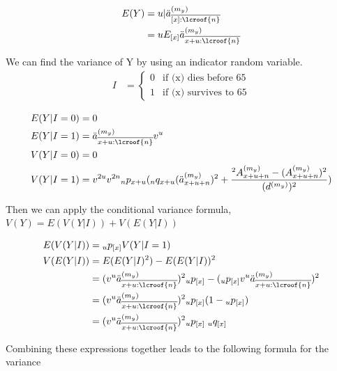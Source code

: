 \documentclass[12pt]{article}
\begin{document}
\begin{align*}
E(Y) &= u|\ddot{a}_{\overline{[x]:\lcroof{n}}}^{(m_y)} \\ 
&= uE_{[x]}\ddot{a}_{\overline{x+u:\lcroof{n}}}^{(m_y)}
\end{align*}

We can find the variance of Y by using an indicator random variable. %
\begin{align*}
I &=
\begin{cases}
0 & \text{if (x) dies before 65} \\
1 & \text{if (x) survives to 65}
\end{cases}
\end{align*}

\begin{align*}
E(Y|I=0) &= 0 \\
E(Y|I=1) &= \ddot{a}_{\overline{x+u:\lcroof{n}}}^{(m_y)} v^u  \\
V(Y|I=0) &=0 \\
V(Y|I=1) &= v^{2u}v^{2n}\hspace{0mm}_np_{x+u}(\hspace{0mm}_nq_{x+u}
(\ddot{a}_{x+u+n}^{(m_y)})^2 + \frac{\hspace{0mm}^2A_{x+u+n}^{(m_y)} - (A_{x+u+n}^{(m_y)})^2}{(d^{(m_y)})^2})
\end{align*}

Then we can apply the conditional variance formula, $V(Y)=E(V(Y|I)) + V(E(Y|I))$ 

\begin{align*}
E(V(Y|I)) &= \hspace{0mm}_up_{[x]}V(Y|I=1) \\
V(E(Y|I)) &= E(E(Y|I)^2) - E(E(Y|I))^2 \\
&= (v^{u}\ddot{a}_{\overline{x+u:\lcroof{n}}}^{(m_y)})^{2} 
\hspace{0mm}_up_{[x]} - (\hspace{0mm}_up_{[x]}v^{u}\ddot{a}_{\overline{x+u:\lcroof{n}}}^{(m_y)})^{2} \\
&= (v^{u}\ddot{a}_{\overline{x+u:\lcroof{n}}}^{(m_y)})^{2}\hspace{0mm}_up_{[x]} (1-\hspace{0mm}_up_{[x]})\\
&=  (v^{u}\ddot{a}_{\overline{x+u:\lcroof{n}}}^{(m_y)})^{2}\hspace{0mm}_up_{[x]}\hspace{1mm}_uq_{[x]}
\end{align*}

Combining these expressions together leads to the following formula for the variance
\end{document}
